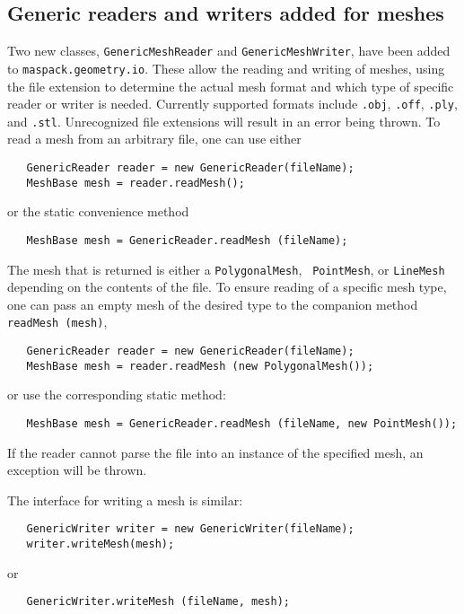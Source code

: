 \documentclass{article}
\begin{document}
\subsection*{Generic readers and writers added for meshes}

Two new classes, {\tt GenericMeshReader} and {\tt GenericMeshWriter},
have been added to {\tt maspack.geometry.io}. These allow the reading
and writing of meshes, using the file extension to determine the
actual mesh format and which type of specific reader or writer is
needed. Currently supported formats include {\tt .obj}, {\tt .off},
{\tt .ply}, and {\tt .stl}. Unrecognized file extensions will result
in an error being thrown. To read a mesh from an arbitrary file, one
can use either
\begin{lstlisting}
   GenericReader reader = new GenericReader(fileName);
   MeshBase mesh = reader.readMesh();
\end{lstlisting}
or the static convenience method
\begin{lstlisting}
   MeshBase mesh = GenericReader.readMesh (fileName);
\end{lstlisting}
The mesh that is returned is either a {\tt PolygonalMesh}, {\tt
PointMesh}, or {\tt LineMesh} depending on the contents of the
file. To ensure reading of a specific mesh type, one can pass
an empty mesh of the desired type to the companion method
{\tt readMesh (mesh)},
\begin{lstlisting}
   GenericReader reader = new GenericReader(fileName);
   MeshBase mesh = reader.readMesh (new PolygonalMesh());
\end{lstlisting}
or use the corresponding static method:
\begin{lstlisting}
   MeshBase mesh = GenericReader.readMesh (fileName, new PointMesh());
\end{lstlisting}
If the reader cannot parse the file into an instance of the specified
mesh, an exception will be thrown.

The interface for writing a mesh is similar:
\begin{lstlisting}
   GenericWriter writer = new GenericWriter(fileName);
   writer.writeMesh(mesh);
\end{lstlisting}
or 
\begin{lstlisting}
   GenericWriter.writeMesh (fileName, mesh);
\end{lstlisting}
\end{document}
